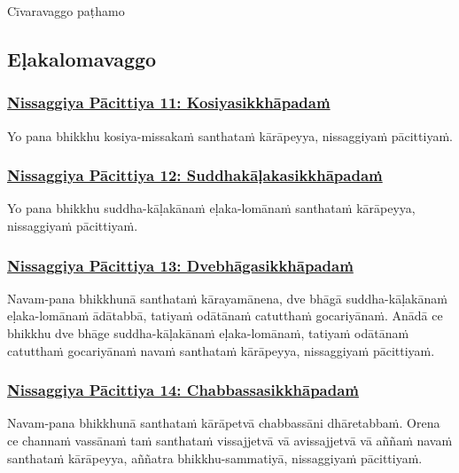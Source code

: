 \begin{center}
  Cīvaravaggo paṭhamo
\end{center}

\subsection{Eḷakalomavaggo}
\vspace{0.2cm}

\subsubsection*{\hyperref[forf-exp11]{Nissaggiya Pācittiya 11: Kosiyasikkhāpadaṁ}}
\label{np11}

Yo pana bhikkhu kosiya-missakaṁ santhataṁ kārāpeyya, nissaggiyaṁ pācittiyaṁ.

\subsubsection*{\hyperref[forf-exp12]{Nissaggiya Pācittiya 12: Suddhakāḷakasikkhāpadaṁ}}
\label{np12}

Yo pana bhikkhu suddha-kāḷakānaṁ eḷaka-lomānaṁ santhataṁ kārāpeyya, nissaggiyaṁ pācittiyaṁ.

\subsubsection*{\hyperref[forf-exp13]{Nissaggiya Pācittiya 13: Dvebhāgasikkhāpadaṁ}}
\label{np13}

Navam-pana bhikkhunā santhataṁ kārayamānena, dve bhāgā suddha-kāḷakānaṁ eḷaka-lomānaṁ ādātabbā, tatiyaṁ odātānaṁ catutthaṁ gocariyānaṁ. Anādā ce bhikkhu dve bhāge suddha-kāḷakānaṁ eḷaka-lomānaṁ, tatiyaṁ odātānaṁ catutthaṁ gocariyānaṁ navaṁ santhataṁ kārāpeyya, nissaggiyaṁ pācittiyaṁ.

\subsubsection*{\hyperref[forf-exp14]{Nissaggiya Pācittiya 14: Chabbassasikkhāpadaṁ}}
\label{np14}

Navam-pana bhikkhunā santhataṁ kārāpetvā chabbassāni dhāretabbaṁ. Orena ce channaṁ vassānaṁ taṁ santhataṁ vissajjetvā vā avissajjetvā vā aññaṁ navaṁ santhataṁ kārāpeyya, aññatra bhikkhu-sammatiyā, nissaggiyaṁ pācittiyaṁ.

